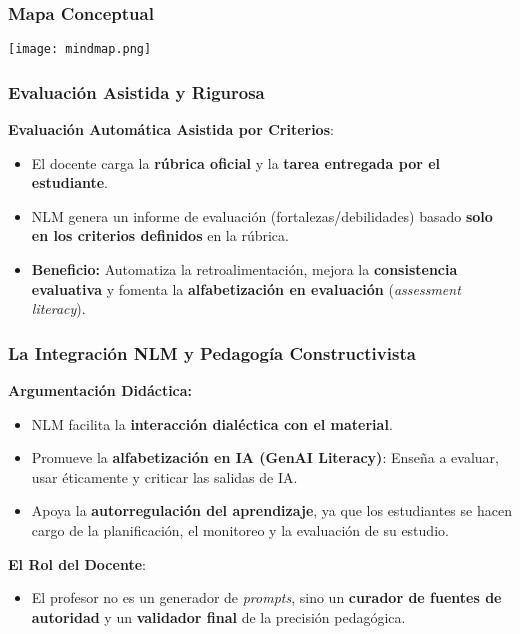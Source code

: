 \documentclass[aspectratio=43]{beamer}
\begin{document}
\begin{frame}
  \frametitle{Mapa Conceptual}
  \begin{center}
    \texttt{[image: mindmap.png]}
  \end{center}
\end{frame}

\begin{frame}
\frametitle{Evaluación Asistida y Rigurosa}

\textbf{Evaluación Automática Asistida por Criterios}:
\begin{itemize}
    \item El docente carga la \textbf{rúbrica oficial} y la \textbf{tarea entregada por el estudiante}.
    \item NLM genera un informe de evaluación (fortalezas/debilidades) basado \textbf{solo en los criterios definidos} en la rúbrica.
    \item \textbf{Beneficio:} Automatiza la retroalimentación, mejora la \textbf{consistencia evaluativa} y fomenta la \textbf{alfabetización en evaluación} (\textit{assessment literacy}).
\end{itemize}

\end{frame}


\begin{frame}
\frametitle{ La Integración NLM y Pedagogía Constructivista}

\textbf{Argumentación Didáctica:}
\begin{itemize}
    \item NLM facilita la \textbf{interacción dialéctica con el material}.
    \item Promueve la \textbf{alfabetización en IA (GenAI Literacy)}: Enseña a evaluar, usar éticamente y criticar las salidas de IA.
    \item Apoya la \textbf{autorregulación del aprendizaje}, ya que los estudiantes se hacen cargo de la planificación, el monitoreo y la evaluación de su estudio.
\end{itemize}
\vfill
\textbf{El Rol del Docente}:
\begin{itemize}
    \item El profesor no es un generador de \textit{prompts}, sino un \textbf{curador de fuentes de autoridad} y un \textbf{validador final} de la precisión pedagógica.
\end{itemize}
\end{frame}
\end{document}
